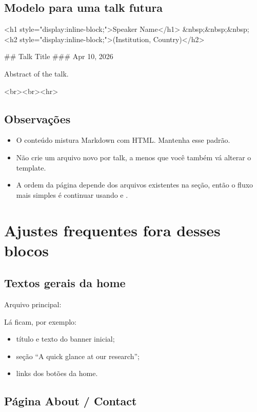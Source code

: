 \documentclass[11pt,a4paper]{article}
\begin{document}
\subsection{Modelo para uma talk futura}

\begin{terminal}
<h1 style="display:inline-block;">Speaker Name</h1>
&nbsp;&nbsp;&nbsp;
<h2 style="display:inline-block;">(Institution, Country)</h2>

## Talk Title
### Apr 10, 2026

Abstract of the talk.

<br><br><hr>
\end{terminal}

\subsection{Observações}

\begin{itemize}
  \item O conteúdo mistura Markdown com HTML. Mantenha esse padrão.
  \item Não crie um arquivo novo por talk, a menos que você também vá alterar o template.
  \item A ordem da página depende dos arquivos existentes na seção, então o fluxo mais simples é continuar usando  e .
\end{itemize}

\section{Ajustes frequentes fora desses blocos}

\subsection{Textos gerais da home}

Arquivo principal: 

Lá ficam, por exemplo:

\begin{itemize}
  \item título e texto do banner inicial;
  \item seção ``A quick glance at our research'';
  \item links dos botões da home.
\end{itemize}

\subsection{Página About / Contact}
\end{document}
